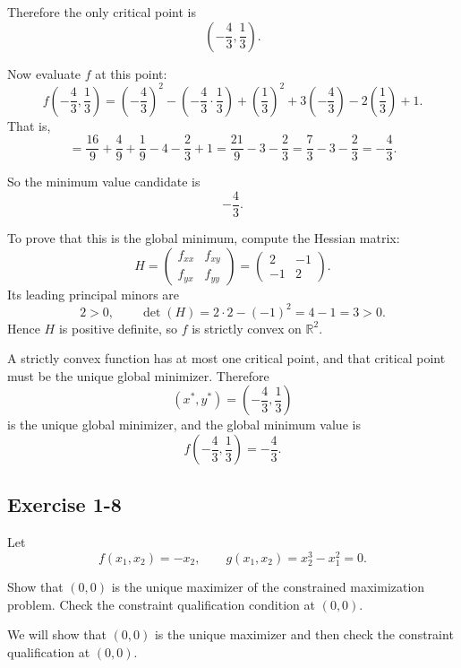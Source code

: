 Therefore the only critical point is
\[
\left(-\frac{4}{3},\frac{1}{3}\right).
\]

Now evaluate \(f\) at this point:
\[
f\left(-\frac{4}{3},\frac{1}{3}\right)
=
\left(-\frac{4}{3}\right)^2
-\left(-\frac{4}{3}\cdot\frac{1}{3}\right)
+\left(\frac{1}{3}\right)^2
+3\left(-\frac{4}{3}\right)
-2\left(\frac{1}{3}\right)+1.
\]
That is,
\[
=
\frac{16}{9}+\frac{4}{9}+\frac{1}{9}-4-\frac{2}{3}+1
=
\frac{21}{9}-3-\frac{2}{3}
=
\frac{7}{3}-3-\frac{2}{3}
=
-\frac{4}{3}.
\]

So the minimum value candidate is
\[
-\frac{4}{3}.
\]

To prove that this is the global minimum, compute the Hessian matrix:
\[
H=
\begin{pmatrix}
f_{xx} & f_{xy}\\
f_{yx} & f_{yy}
\end{pmatrix}
=
\begin{pmatrix}
2 & -1\\
-1 & 2
\end{pmatrix}.
\]
Its leading principal minors are
\[
2>0,
\qquad
\det(H)=2\cdot 2-(-1)^2=4-1=3>0.
\]
Hence \(H\) is positive definite, so \(f\) is strictly convex on \(\mathbb{R}^2\).

A strictly convex function has at most one critical point, and that critical point must be the unique global minimizer. Therefore
\[
\boxed{
\left(x^*,y^*\right)=\left(-\frac{4}{3},\frac{1}{3}\right)
}
\]
is the unique global minimizer, and the global minimum value is
\[
\boxed{
f\left(-\frac{4}{3},\frac{1}{3}\right)=-\frac{4}{3}.
}
\]



\vspace{30pt}
\begin{tcolorbox}[breakable]
\subsection*{Exercise 1-8}

Let
\[
f(x_1,x_2) = -x_2,
\qquad
g(x_1,x_2)=x_2^3 - x_1^2=0.
\]

Show that $(0,0)$ is the unique maximizer of the constrained maximization problem.
Check the constraint qualification condition at $(0,0)$.

\end{tcolorbox}



We will show that \((0,0)\) is the unique maximizer and then check the constraint qualification at \((0,0)\).

